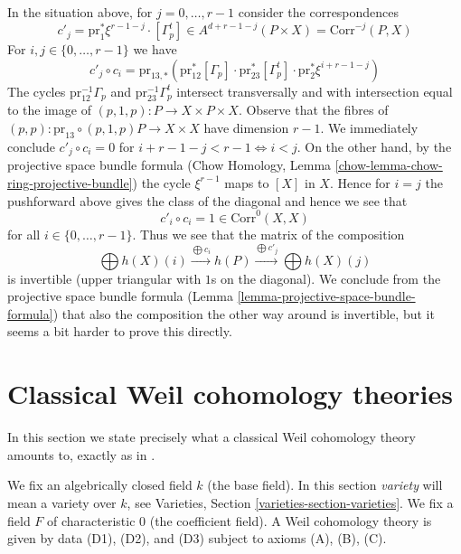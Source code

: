 \noindent
In the situation above, for $j = 0, \ldots, r - 1$ consider
the correspondences
$$
c'_j = \text{pr}_1^*\xi^{r - 1 - j} \cdot [\Gamma_p^t] \in
A^{d + r - 1 - j}(P \times X) = \text{Corr}^{-j}(P, X)
$$
For $i, j \in \{0, \ldots, r - 1\}$ we have
$$
c'_j \circ c_i =
\text{pr}_{13, *}(
\text{pr}_{12}^*[\Gamma_p] \cdot \text{pr}_{23}^*[\Gamma_p^t]
\cdot \text{pr}_2^*\xi^{i + r - 1 - j})
$$
The cycles $\text{pr}_{12}^{-1}\Gamma_p$ and 
$\text{pr}_{23}^{-1}\Gamma_p^t$ intersect transversally and
with intersection equal to the image of
$(p, 1, p) : P \to X \times P \times X$.
Observe that the fibres of
$(p, p) : \text{pr}_{13} \circ (p, 1, p) P \to X \times X$
have dimension $r - 1$. We immediately conclude
$c'_j \circ c_i = 0$ for $i + r - 1 - j < r - 1 \Leftrightarrow i < j$.
On the other hand, by the projective space bundle formula
(Chow Homology, Lemma \ref{chow-lemma-chow-ring-projective-bundle})
the cycle $\xi^{r - 1}$ maps
to $[X]$ in $X$. Hence for $i = j$ the pushforward above
gives the class of the diagonal and hence
we see that
$$
c'_i \circ c_i = 1 \in \text{Corr}^0(X, X)
$$
for all $i \in \{0, \ldots, r - 1\}$. Thus we see that the matrix
of the composition
$$
\bigoplus h(X)(i)
\xrightarrow{\bigoplus c_i}
h(P)
\xrightarrow{\bigoplus c'_j}
\bigoplus h(X)(j)
$$
is invertible (upper triangular with $1$s on the diagonal).
We conclude from the projective space bundle formula
(Lemma \ref{lemma-projective-space-bundle-formula})
that also the composition the other way around is
invertible, but it seems a bit harder to prove this directly.








\section{Classical Weil cohomology theories}
\label{section-axioms-classical}

\noindent
In this section we state precisely what a classical Weil cohomology
theory amounts to, exactly as in \cite[Section 1.2]{Kleiman-cycles}.

\medskip\noindent
We fix an algebrically closed field $k$ (the base field).
In this section {\it variety} will mean a variety over $k$, see
Varieties, Section \ref{varieties-section-varieties}.
We fix a field $F$ of characteristic $0$ (the coefficient field).
A Weil cohomology theory is given by data (D1), (D2), and (D3)
subject to axioms (A), (B), (C).

